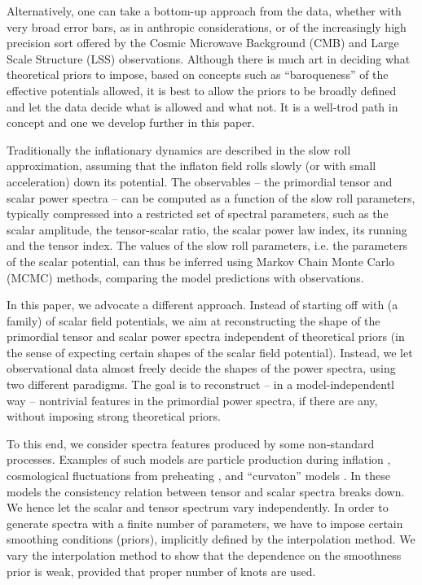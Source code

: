 \documentclass[a4paper,11pt]{article}
\begin{document}
Alternatively, one can take a bottom-up approach from the data,
whether with very broad error bars, as in anthropic considerations, or
of the increasingly high precision sort offered by the Cosmic
Microwave Background (CMB) and Large Scale Structure (LSS)
observations. Although there is much art in deciding what theoretical
priors to impose, based on concepts such as ``baroqueness'' of the
effective potentials allowed, it is best to allow the priors to be
broadly defined and let the data decide what is allowed and what
not. It is a well-trod path in concept and one we develop further in
this paper.

Traditionally the inflationary dynamics are described in the slow roll
approximation, assuming that the inflaton field rolls slowly (or with
small acceleration) down its potential. The observables -- the
primordial tensor and scalar power spectra -- can be computed as a
function of the slow roll parameters, typically compressed into a
restricted set of spectral parameters, such as the scalar amplitude,
the tensor-scalar ratio, the scalar power law index, its running and
the tensor index. The values of the slow roll parameters, i.e. the
parameters of the scalar potential, can thus be inferred using Markov
Chain Monte Carlo (MCMC) methods, comparing the model predictions with
observations. 

In this paper, we advocate a different approach. Instead of starting
off with (a family) of scalar field potentials, we aim at
reconstructing the shape of the primordial tensor and scalar power
spectra independent of theoretical priors (in the sense of expecting
certain shapes of the scalar field potential). Instead, we let
observational data almost freely decide the shapes of the power
spectra, using two different paradigms. The goal is to reconstruct --
in a model-independentl way -- nontrivial features in the primordial
power spectra, if there are any, without imposing strong theoretical
priors.

To this end, we consider spectra features produced by some
non-standard processes. Examples of such models are particle
production during inflation \cite{Barnaby2009a, Barnaby2009b},
cosmological fluctuations from preheating \cite{Bond2009}, and
``curvaton'' models \cite{Linde1996,Lyth2003}. In these models the
consistency relation between tensor and scalar spectra breaks down. We
hence let the scalar and tensor spectrum vary independently. In order
to generate spectra with a finite number of parameters, we have to
impose certain smoothing conditions (priors), implicitly defined by the
interpolation method. We vary the interpolation method to show that
the dependence on the smoothness prior is weak, provided that proper
number of knots are used\footnotemark.
\end{document}
